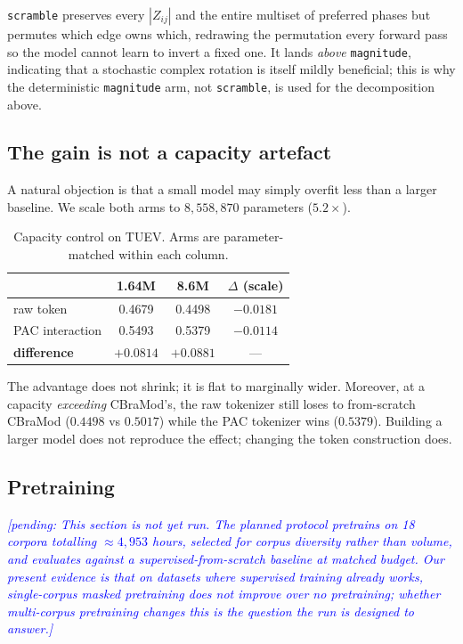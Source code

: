 \documentclass{article}
\newcommand{\pending}[1]{\textcolor{blue}{\textit{[pending: #1]}}}
\begin{document}
\texttt{scramble} preserves every $|Z_{ij}|$ and the entire multiset of preferred
phases but permutes which edge owns which, redrawing the permutation every
forward pass so the model cannot learn to invert a fixed one. It lands
\emph{above} \texttt{magnitude}, indicating that a stochastic complex rotation is
itself mildly beneficial; this is why the deterministic \texttt{magnitude} arm,
not \texttt{scramble}, is used for the decomposition above.

\subsection{The gain is not a capacity artefact}
\label{sec:capacity}

A natural objection is that a small model may simply overfit less than a larger
baseline. We scale both arms to $8{,}558{,}870$ parameters ($5.2\times$).

\begin{table}[t]
\caption{Capacity control on TUEV. Arms are parameter-matched within each column.}
\label{tab:capacity}
\begin{center}
\begin{tabular}{lccc}
\toprule
& 1.64M & 8.6M & $\Delta$ (scale) \\
\midrule
raw token & 0.4679 & 0.4498 & $-0.0181$ \\
PAC interaction & 0.5493 & 0.5379 & $-0.0114$ \\
\midrule
\textbf{difference} & $\mathbf{+0.0814}$ & $\mathbf{+0.0881}$ & --- \\
\bottomrule
\end{tabular}
\end{center}
\end{table}

The advantage does not shrink; it is flat to marginally wider. Moreover, at a
capacity \emph{exceeding} CBraMod's, the raw tokenizer still loses to
from-scratch CBraMod ($0.4498$ vs $0.5017$) while the PAC tokenizer wins
($0.5379$). Building a larger model does not reproduce the effect; changing the
token construction does.

\subsection{Pretraining}

\pending{This section is not yet run. The planned protocol pretrains on 18
corpora totalling $\approx 4{,}953$ hours, selected for corpus diversity rather
than volume, and evaluates against a supervised-from-scratch baseline at matched
budget. Our present evidence is that on datasets where supervised training
already works, single-corpus masked pretraining does not improve over no
pretraining; whether multi-corpus pretraining changes this is the question the
run is designed to answer.}
\end{document}
